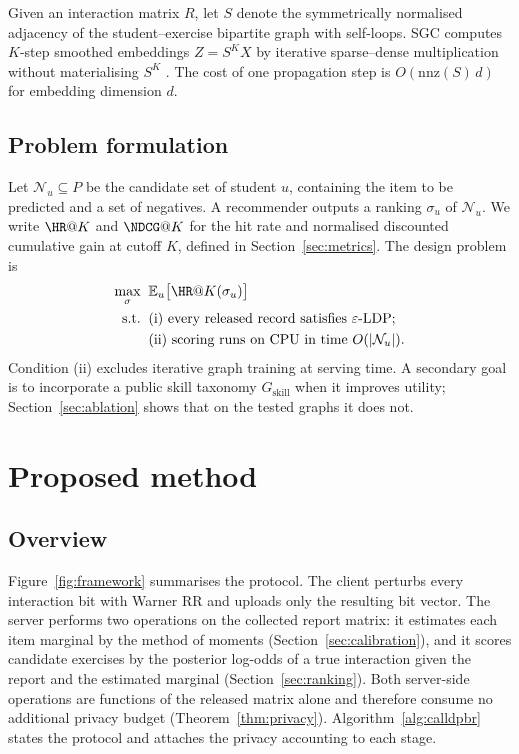 \documentclass[pdflatex,sn-basic,Numbered]{sn-jnl}
\theoremstyle{plain}
\theoremstyle{remark}
\theoremstyle{definition}
\newcommand{\eps}{\varepsilon}
\newcommand{\E}{\mathbb{E}}
\begin{document}
Given an interaction matrix $R$, let $S$ denote the symmetrically normalised adjacency of the student--exercise bipartite graph with self-loops. SGC computes $K$-step smoothed embeddings $Z=S^{K}X$ by iterative sparse--dense multiplication without materialising $S^{K}$ \cite{wu2019sgc}. The cost of one propagation step is $O(\mathrm{nnz}(S)\,d)$ for embedding dimension $d$.

\subsection{Problem formulation}\label{sec:problem}

Let $\mathcal{N}_u\subseteq P$ be the candidate set of student $u$, containing the item to be predicted and a set of negatives. A recommender outputs a ranking $\sigma_u$ of $\mathcal{N}_u$. We write $\HR@K$ and $\NDCG@K$ for the hit rate and normalised discounted cumulative gain at cutoff $K$, defined in Section~\ref{sec:metrics}. The design problem is
\begin{equation}\label{eq:problem}
\begin{aligned}
\max_{\sigma}\;\; & \E_{u}\big[\HR@K(\sigma_u)\big]\\
\text{s.t.}\;\; & \text{(i) every released record satisfies $\eps$-LDP;}\\
& \text{(ii) scoring runs on CPU in time } O(|\mathcal{N}_u|).
\end{aligned}
\end{equation}
Condition (ii) excludes iterative graph training at serving time. A secondary goal is to incorporate a public skill taxonomy $G_{\text{skill}}$ when it improves utility; Section~\ref{sec:ablation} shows that on the tested graphs it does not.

\section{Proposed method}\label{sec:method}

\subsection{Overview}

Figure~\ref{fig:framework} summarises the protocol. The client perturbs every interaction bit with Warner RR and uploads only the resulting bit vector. The server performs two operations on the collected report matrix: it estimates each item marginal by the method of moments (Section~\ref{sec:calibration}), and it scores candidate exercises by the posterior log-odds of a true interaction given the report and the estimated marginal (Section~\ref{sec:ranking}). Both server-side operations are functions of the released matrix alone and therefore consume no additional privacy budget (Theorem~\ref{thm:privacy}). Algorithm~\ref{alg:calldpbr} states the protocol and attaches the privacy accounting to each stage.
\end{document}
